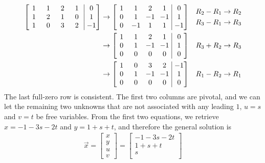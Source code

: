 \begin{solution}
\begin{align*}
\left[\begin{array}{@{\,}wc{10pt}wc{10pt}wc{10pt}wc{10pt}|wc{10pt}@{\,}}
1 & 1 & 2 & 1 & 0 \\
1 & 2 & 1 & 0 & 1 \\
1 & 0 & 3 & 2 & -1
\end{array}\right] 
& \to 
\left[\begin{array}{@{\,}wc{10pt}wc{10pt}wc{10pt}wc{10pt}|wc{10pt}@{\,}}
1 & 1 & 2 & 1 & 0 \\
0 & 1 & -1 & -1 & 1 \\
0 & -1 & 1 & 1 & -1
\end{array}\right] 
& \begin{aligned}
R_2 - R_1 &\to R_2 \\
R_3 - R_1 &\to R_3
\end{aligned} \\
& \to 
\left[\begin{array}{@{\,}wc{10pt}wc{10pt}wc{10pt}wc{10pt}|wc{10pt}@{\,}}
1 & 1 & 2 & 1 & 0 \\
0 & 1 & -1 & -1 & 1 \\
0 & 0 & 0 & 0 & 0
\end{array}\right] 
& R_3 + R_2 \to R_3 \\
& \to 
\left[\begin{array}{@{\,}wc{10pt}wc{10pt}wc{10pt}wc{10pt}|wc{10pt}@{\,}}
1 & 0 & 3 & 2 & -1 \\
0 & 1 & -1 & -1 & 1 \\
0 & 0 & 0 & 0 & 0
\end{array}\right] 
& R_1 - R_2 \to R_1
\end{align*} 
The last full-zero row is consistent. The first two columns are pivotal, and we can let the remaining two unknowns that are not associated with any leading $1$, $u=s$ and $v=t$ be free variables. From the first two equations, we retrieve $x = -1 - 3s - 2t$ and $y = 1 + s + t$, and therefore the general solution is
\begin{align*}
\vec{x} = 
\begin{bmatrix}
x \\
y \\
u \\
v
\end{bmatrix} 
=
\begin{bmatrix}
-1 - 3s - 2t \\
1 + s + t \\
s \\

\end{bmatrix}
\end{align*}
\end{solution}

